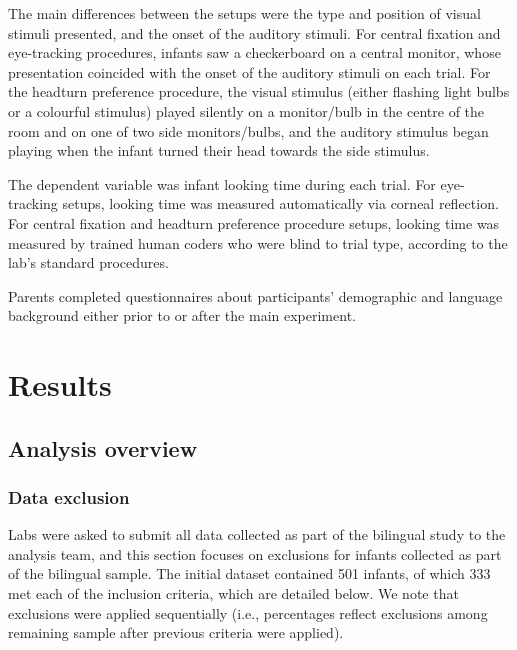 \documentclass[,man,floatsintext]{apa6}
\begin{document}
The main differences between the setups were the type and position of visual stimuli presented, and the onset of the auditory stimuli. For central fixation and eye-tracking procedures, infants saw a checkerboard on a central monitor, whose presentation coincided with the onset of the auditory stimuli on each trial. For the headturn preference procedure, the visual stimulus (either flashing light bulbs or a colourful stimulus) played silently on a monitor/bulb in the centre of the room and on one of two side monitors/bulbs, and the auditory stimulus began playing when the infant turned their head towards the side stimulus.

The dependent variable was infant looking time during each trial. For eye-tracking setups, looking time was measured automatically via corneal reflection. For central fixation and headturn preference procedure setups, looking time was measured by trained human coders who were blind to trial type, according to the lab's standard procedures.

Parents completed questionnaires about participants' demographic and language background either prior to or after the main experiment.

\hypertarget{results}{%
\section{Results}\label{results}}

\hypertarget{analysis-overview}{%
\subsection{Analysis overview}\label{analysis-overview}}

\hypertarget{data-exclusion}{%
\subsubsection{Data exclusion}\label{data-exclusion}}

Labs were asked to submit all data collected as part of the bilingual study to the analysis team, and this section focuses on exclusions for infants collected as part of the bilingual sample. The initial dataset contained 501 infants, of which 333 met each of the inclusion criteria, which are detailed below. We note that exclusions were applied sequentially (i.e., percentages reflect exclusions among remaining sample after previous criteria were applied).
\end{document}
